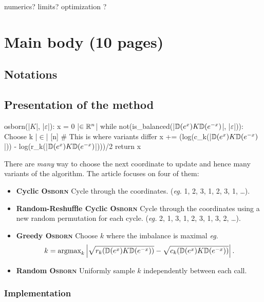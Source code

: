 numerics?
limits? 
optimization ?

\section{Main body (10 pages)}

\subsection{Notations}

\subsection{Presentation of the method}


\begin{code}
osborn(|\(K\)|, |\(\varepsilon\)|):
    x = 0 |\(\in \mathbb{R}^n\)|
    while not(is_balanced(|\(\mathbb{D}(e^x) K \mathbb{D}(e^{-x})\)|, |\(\varepsilon\)|)):
        Choose k |\(\in\)| [n] # This is where variants differ
        x += (log(c_k(|\(\mathbb{D}(e^x) K \mathbb{D}(e^{-x})\)|)) - log(r_k(|\(\mathbb{D}(e^x) K \mathbb{D}(e^{-x})\)|)))/2
    return x
\end{code}

There are \textit{many} way to choose the next coordinate to update and hence many variants of the algorithm. The article focuses on four of them:
\begin{itemize}
    \item \textbf{Cyclic \textsc{Osborn}} Cycle through the coordinates. (\textit{eg.} {\color{magenta}1, 2, 3}, {\color{cyan}1, 2, 3}, {\color{red}1,} \dots).
    \item \textbf{Random-Reshuffle Cyclic \textsc{Osborn}} Cycle through the coordinates using a new random permutation for each cycle. (\textit{eg.} {\color{magenta}2, 1, 3}, {\color{cyan}1, 2, 3}, {\color{red}1, 3, 2}, \dots).
    \item \textbf{Greedy \textsc{Osborn}} Choose \(k\) where the imbalance is maximal \textit{eg.}
    \[
        k = \operatorname{argmax}_{k}\left|\sqrt{r_k(\mathbb{D}(e^x) K \mathbb{D}(e^{-x}))} - \sqrt{c_k(\mathbb{D}(e^x) K \mathbb{D}(e^{-x}))}\right|.    
    \]
    \item \textbf{Random \textsc{Osborn}} Uniformly sample \(k\) independently between each call.
\end{itemize}

\subsubsection{Implementation}

